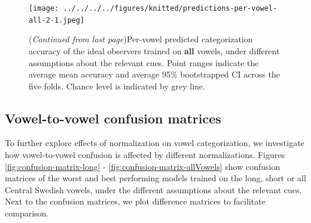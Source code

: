 \documentclass[utf8]{frontiers_suppmat} %
\begin{document}
\begin{figure}[H]

{\centering \texttt{[image: ../../../../figures/knitted/predictions-per-vowel-all-2-1.jpeg]} 

}

\caption{(\emph{Continued from last page})Per-vowel predicted categorization accuracy of the ideal observers trained on \textbf{all} vowels, under different assumptions about the relevant cues. Point ranges indicate the average mean accuracy and average 95\% bootstrapped CI across the five folds. Chance level is indicated by grey line.}\label{fig:predictions-per-vowel-all-2}
\end{figure}

\hypertarget{sec:confusion}{%
\subsection{Vowel-to-vowel confusion matrices}\label{sec:confusion}}
To further explore effects of normalization on vowel categorization, we investigate how vowel-to-vowel confusion is affected by different normalizations. Figures \ref{fig:confusion-matrix-long} - \ref{fig:confusion-matrix-allVowels} show confusion matrices of the worst and best performing models trained on the long, short or all Central Swedish vowels, under the different assumptions about the relevant cues. Next to the confusion matrices, we plot difference matrices to facilitate comparison.
\end{document}
